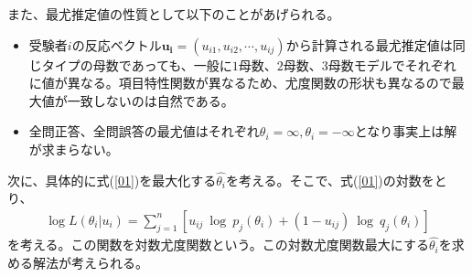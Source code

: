 \documentclass[12pt]{jarticle}
\numberwithin{equation}{subsection}
\begin{document}
また、最尤推定値の性質として以下のことがあげられる。
\begin{itemize}
  \item 受験者$i$の反応ベクトル$\boldsymbol{u_i} = (u_{i1}, u_{i2}, \cdots, u_{ij})$から計算される最尤推定値は同じタイプの母数であっても、一般に$1$母数、$2$母数、$3$母数モデルでそれぞれに値が異なる。項目特性関数が異なるため、尤度関数の形状も異なるので最大値が一致しないのは自然である。
  \item 全問正答、全問誤答の最尤値はそれぞれ$\theta_i = \infty,\theta_i = -\infty$となり事実上は解が求まらない。
\end{itemize}

次に、具体的に式(\ref{01})を最大化する$\hat{\theta_i}$を考える。そこで、式(\ref{01})の対数をとり、
\begin{align}
  \displaystyle \log L(\theta_i | u_{i}) =\sum_{j = 1}^{n} [u_{ij} \  \log \  p_{j}(\theta_i) + (1 - u_{ij}) \ \log \  q_{j}(\theta_i)]
\end{align}
を考える。この関数を対数尤度関数という。この対数尤度関数最大にする$\hat{\theta_i}$を求める解法が考えられる。
\end{document}

